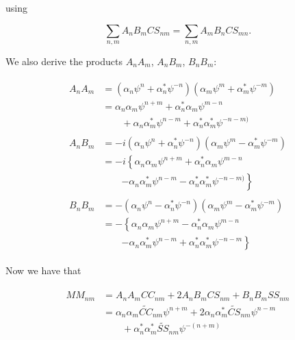 \documentclass[apj]{emulateapj}
\newcommand{\CCt}{\widetilde{CC}}
\newcommand{\CSt}{\widetilde{CS}}
\newcommand{\SSt}{\widetilde{SS}}
\newcommand{\eith}{\psi}
\begin{document}
\noindent using

\begin{equation}
\sum_{n,m}A_nB_mCS_{nm} = \sum_{n,m} A_mB_n CS_{mn}.
\end{equation}

We also derive the products $A_nA_m$, $A_nB_m$, $B_nB_m$:


\begin{align}
\begin{split}
A_nA_m &= \left(\alpha_n\eith^n + \alpha^{*}_n\eith^{-n}\right)\left(\alpha_m\eith^m + \alpha^{*}_m\eith^{-m}\right)\\
       &= \alpha_n\alpha_m \eith^{n+m} + \alpha^{*}_n\alpha_m\eith^{m-n} \\
       &\qquad + \alpha_n\alpha^{*}_m \eith^{n-m} + \alpha^{*}_n\alpha^{*}_m\eith^{-n-m)}
\end{split}\\
\begin{split}
A_nB_m &= -i\left(\alpha_n\eith^n + \alpha^{*}_n\eith^{-n}\right)\left(\alpha_m\eith^m - \alpha^{*}_m\eith^{-m}\right)\\
       &= -i\left\{\alpha_n\alpha_m \eith^{n+m} + \alpha^{*}_n\alpha_m\eith^{m-n} \right.\\
       &\qquad \left. - \alpha_n\alpha^{*}_m \eith^{n-m} - \alpha^{*}_n\alpha^{*}_m\eith^{-n-m)}\right\}
\end{split}\\
\begin{split}
B_nB_m &= -\left(\alpha_n\eith^n - \alpha^{*}_n\eith^{-n}\right)\left(\alpha_m\eith^m - \alpha^{*}_m\eith^{-m}\right)\\
       &= -\left\{\alpha_n\alpha_m \eith^{n+m} - \alpha^{*}_n\alpha_m\eith^{m-n} \right.\\
       &\qquad \left.- \alpha_n\alpha^{*}_m \eith^{n-m} + \alpha^{*}_n\alpha^{*}_m\eith^{-n-m}\right\}
\end{split}
\end{align}


Now we have that

\begin{align}
\begin{split}
MM_{nm} &= A_nA_mCC_{nm} + 2A_nB_mCS_{nm} + B_nB_mSS_{nm}\\
        &= \alpha_n\alpha_m\CCt_{nm}\eith^{n+m} + 2\alpha_n\alpha^{*}_m\CSt_{nm}\eith^{n-m} \\
        &\qquad + \alpha^{*}_n\alpha^{*}_m\SSt_{nm}\eith^{-(n+m)}
\end{split}
\end{align}
\end{document}
